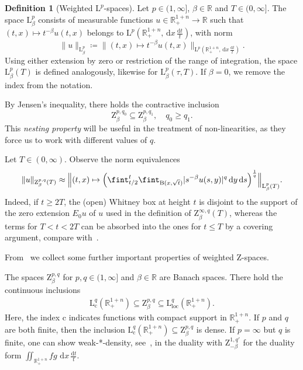 \documentclass[11pt, leqno]{amsart}
\theoremstyle{definition}
\newtheorem{definition}[theorem]{Definition}
\newcommand{\R}{\mathbb{R}}
\renewcommand{\L}{\mathrm{L}}
\newcommand{\Z}{\mathrm{Z}}
\renewcommand{\d}{\,\mathrm{d}}
\newcommand{\ddt}{\,\frac{\mathrm{d}t}{t}}
\newcommand{\cc}{\mathrm{c}}
\newcommand{\B}{\mathrm{B}}
\newcommand{\loc}{\mathrm{loc}}
\begin{document}
	\begin{definition}[Weighted $\L^p$-spaces]
		Let $p \in (1,\infty]$, $\beta \in \R$ and $T \in (0,\infty]$. The space $\L^p_\beta$ consists of measurable functions $u \in \R^{1+n}_+ \to \R$ such that $(t,x) \mapsto t^{-\beta} u(t,x)$ belongs to $\L^p(\R^{1+n}_+, \d x \ddt)$, with norm $$\| u \|_{\L^p_\beta} \coloneqq \| (t,x) \mapsto t^{-\beta} u(t,x) \|_{\L^p(\R^{1+n}_+, \d x \ddt)}.$$
		Using either extension by zero or restriction of the range of integration,
		the space $\L^p_\beta(T)$ is defined analogously, likewise for $\L^p_\beta(\tau,T)$. If $\beta = 0$, we remove the index from the notation.
	\end{definition}

	By Jensen's inequality, there holds the contractive inclusion $$\Z^{p,q_0}_\beta \subseteq \Z^{p,q_1}_\beta, \quad q_0 \geq q_1.$$
	{This \emph{nesting property} will be useful in the treatment of non-linearities, as they force us to work with different values of $q$.}

	Let $T \in (0,\infty)$. %
	Observe the norm equivalences%
	\begin{align}
		\| u \|_{\Z^{p,q}_\beta(T)} \approx \Bigl\| (t,x) \mapsto \Bigl( \fint_{t/2}^t \fint_{\B(x, \sqrt{t})} |s^{-\beta} u(s,y)|^q \d y \d s \Bigr)^\frac{1}{q} \Bigr\|_{\L^p_\beta(T)}.
	\end{align}
	Indeed, if $t \geq 2T$, the (open) Whitney box at height $t$ is disjoint to the support of the zero extension $E_0 u$ of $u$ used in the definition of $\Z^{\infty,q}_\beta(T)$, whereas the terms for $T<t <2T$ can be absorbed into the ones for $t\le T$ by a covering argument, compare with~\cite[Prop.~3.7]{Luca}.


	From~\cite{Luca} we collect some further important properties of weighted $\Z$-spaces.

	The spaces $\Z^{p,q}_\beta$ for $p,q \in (1,\infty]$ and $\beta \in \R$ are Banach spaces. There hold the continuous inclusions
	\begin{align}
		\label{eq:Z_loc_embedding}
		\L^q_\cc(\R^{1+n}_+) \subseteq \Z^{p,q}_\beta \subseteq \L^q_\loc(\R^{1+n}_+).
	\end{align}
	Here, the index $\cc$ indicates functions with compact support in $\R^{1+n}_+$. If $p$ and $q$ are both finite, then the inclusion $\L^q_\cc(\R^{1+n}_+) \subseteq \Z^{p,q}_\beta$ is dense. If $p = \infty$ but $q$ is finite, one can show weak-*-density, see~\cite[Lem.~3.1]{AH2}, in the duality with $\Z^{1,q'}_{-\beta}$ for the duality form $\iint_{\R^{1+n}_+} f g \, \d x \ddt$.
\end{document}
